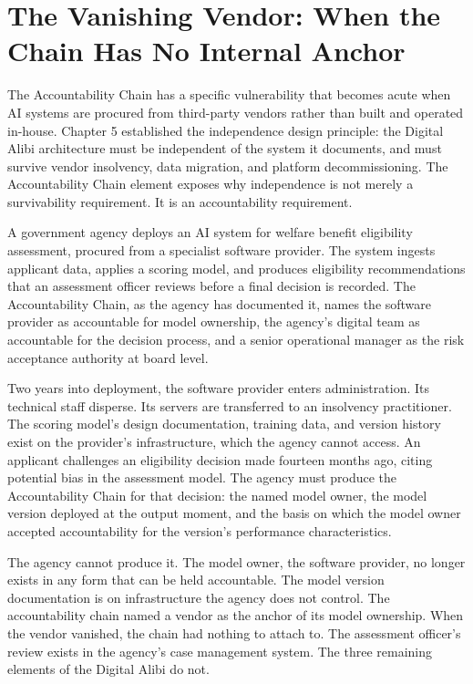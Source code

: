 \section{The Vanishing Vendor: When the Chain Has No Internal Anchor}

The Accountability Chain has a specific vulnerability that becomes acute when AI systems are procured from third-party vendors rather than built and operated in-house. Chapter 5 established the independence design principle: the Digital Alibi architecture must be independent of the system it documents, and must survive vendor insolvency, data migration, and platform decommissioning. The Accountability Chain element exposes why independence is not merely a survivability requirement. It is an accountability requirement.

A government agency deploys an AI system for welfare benefit eligibility assessment, procured from a specialist software provider. The system ingests applicant data, applies a scoring model, and produces eligibility recommendations that an assessment officer reviews before a final decision is recorded. The Accountability Chain, as the agency has documented it, names the software provider as accountable for model ownership, the agency's digital team as accountable for the decision process, and a senior operational manager as the risk acceptance authority at board level.

Two years into deployment, the software provider enters administration. Its technical staff disperse. Its servers are transferred to an insolvency practitioner. The scoring model's design documentation, training data, and version history exist on the provider's infrastructure, which the agency cannot access. An applicant challenges an eligibility decision made fourteen months ago, citing potential bias in the assessment model. The agency must produce the Accountability Chain for that decision: the named model owner, the model version deployed at the output moment, and the basis on which the model owner accepted accountability for the version's performance characteristics.

The agency cannot produce it. The model owner, the software provider, no longer exists in any form that can be held accountable. The model version documentation is on infrastructure the agency does not control. The accountability chain named a vendor as the anchor of its model ownership. When the vendor vanished, the chain had nothing to attach to. The assessment officer's review exists in the agency's case management system. The three remaining elements of the Digital Alibi do not.

